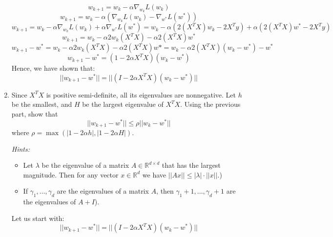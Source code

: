 \documentclass{article}
\begin{document}
\begin{aprob}
\begin{enumerate}
    \begin{equation}
        w_{k+1} = w_k - \alpha\nabla_{w_k}L(w_k)
    \end{equation}
    \begin{equation}
        w_{k+1} = w_k - \alpha(\nabla_{w_k}L(w_k)-\nabla_{w^*}L(w^*))
    \end{equation}
    \begin{equation}
        w_{k+1} = w_k - \alpha\nabla_{w_k}L(w_k)+\alpha\nabla_{w^*}L(w^*) = w_k - \alpha(2(X^TX)w_k - 2X^Ty) + \alpha(2(X^TX)w^* - 2X^Ty)
    \end{equation}
    \begin{equation}
        w_{k+1} = w_k - \alpha2w_k(X^TX) - \alpha2(X^TX)w^*
    \end{equation}
    \begin{equation}
        w_{k+1} - w^* = w_k - \alpha2w_k(X^TX) - \alpha2(X^TX)w* = w_k - \alpha2(X^TX)(w_k - w^*) - w^*
    \end{equation}
    \begin{equation}
        w_{k+1} - w^* = (1-2\alpha X^TX)(w_k - w^*)
    \end{equation}
    Hence, we have shown that:
    \begin{equation}
    ||w_{k+1}-w^*|| = ||(I-2\alpha X^TX)(w_k-w^*)||
    \end{equation}

        \item{} Since $X^TX$ is positive semi-definite, all its eigenvalues are nonnegative. Let $h$ be the smallest, and $H$ be the largest eigenvalue of $X^TX$. Using the previous part, show that $$
        ||w_{k+1}-w^*|| \leq \rho||w_k-w^*||$$ 
        where $\rho = \max(|1-2\alpha h|, |1-2\alpha H|)$. 
        
        \textit{Hints:}
        \begin{itemize}
            \item Let $\lambda$ be the eigenvalue of a matrix $A \in \mathbb{R}^{d\times d}$ that has the largest magnitude. Then for any vector $x \in \mathbb{R}^d$ we have $||Ax|| \leq |\lambda|\cdot||x||$.) 
            \item If $\gamma_1,\dots,\gamma_d$ are the eigenvalues of a matrix $A$, then $\gamma_1+1,\dots,\gamma_d+1$ are the eigenvalues of $A + I$).
        \end{itemize}
        
        Let us start with: 
    \begin{equation}
        ||w_{k+1}-w^*|| = ||(I-2\alpha X^TX)(w_k-w^*)||
    \end{equation}
    

\end{enumerate}
\end{aprob}
\end{document}
